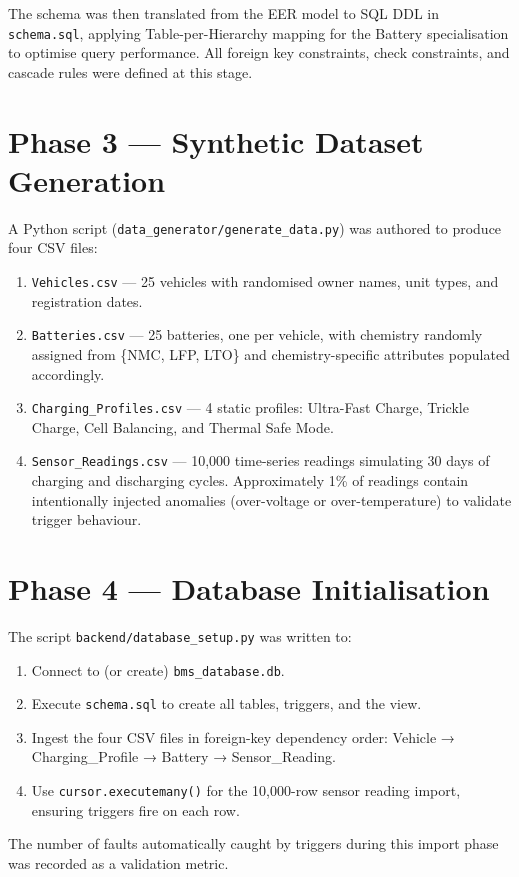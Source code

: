 \documentclass[12pt, a4paper]{report}
\begin{document}
The schema was then translated from the EER model to SQL DDL in \texttt{schema.sql}, applying Table-per-Hierarchy mapping for the Battery specialisation to optimise query performance. All foreign key constraints, check constraints, and cascade rules were defined at this stage.

\section{Phase 3 — Synthetic Dataset Generation}
A Python script (\texttt{data\_generator/generate\_data.py}) was authored to produce four CSV files:

\begin{enumerate}
    \item \texttt{Vehicles.csv} — 25 vehicles with randomised owner names, unit types, and registration dates.
    \item \texttt{Batteries.csv} — 25 batteries, one per vehicle, with chemistry randomly assigned from \{NMC, LFP, LTO\} and chemistry-specific attributes populated accordingly.
    \item \texttt{Charging\_Profiles.csv} — 4 static profiles: Ultra-Fast Charge, Trickle Charge, Cell Balancing, and Thermal Safe Mode.
    \item \texttt{Sensor\_Readings.csv} — 10,000 time-series readings simulating 30 days of charging and discharging cycles. Approximately 1\% of readings contain intentionally injected anomalies (over-voltage or over-temperature) to validate trigger behaviour.
\end{enumerate}

\section{Phase 4 — Database Initialisation}
The script \texttt{backend/database\_setup.py} was written to:
\begin{enumerate}
    \item Connect to (or create) \texttt{bms\_database.db}.
    \item Execute \texttt{schema.sql} to create all tables, triggers, and the view.
    \item Ingest the four CSV files in foreign-key dependency order: Vehicle → Charging\_Profile → Battery → Sensor\_Reading.
    \item Use \texttt{cursor.executemany()} for the 10,000-row sensor reading import, ensuring triggers fire on each row.
\end{enumerate}
The number of faults automatically caught by triggers during this import phase was recorded as a validation metric.
\end{document}
